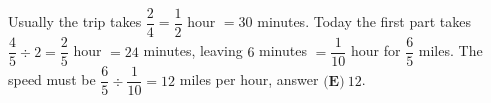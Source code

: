 Usually the trip takes $\dfrac24=\dfrac12$ hour $=30$ minutes. Today the first part takes $\dfrac{4}{5}\div2=\dfrac25$ hour $=24$ minutes, leaving $6$ minutes $=\dfrac1{10}$ hour for $\dfrac65$ miles. The speed must be $\dfrac65\div\dfrac1{10}=12$ miles per hour, answer $\boxed{\textbf{(E)}\ 12}$.
